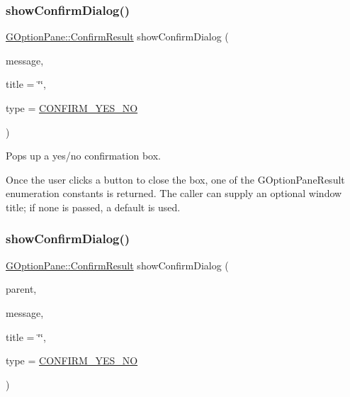 \subsubsection{\texorpdfstring{show\+Confirm\+Dialog()}{showConfirmDialog()}\hspace{0.1cm}{\footnotesize\ttfamily [1/3]}}
{\footnotesize\ttfamily \mbox{\hyperlink{classsgl_1_1GOptionPane_a1cc9e8685029e39646671ed71f32d47d}{G\+Option\+Pane\+::\+Confirm\+Result}} show\+Confirm\+Dialog (\begin{DoxyParamCaption}\item[{const std\+::string \&}]{message,  }\item[{const std\+::string \&}]{title = {\ttfamily \char`\"{}\char`\"{}},  }\item[{\mbox{\hyperlink{classsgl_1_1GOptionPane_a6a1aaf19c06f5a6bef89ea6415547049}{Confirm\+Type}}}]{type = {\ttfamily \mbox{\hyperlink{classsgl_1_1GOptionPane_a6a1aaf19c06f5a6bef89ea6415547049a964914d27eb73a202938a53f43adc4b1}{C\+O\+N\+F\+I\+R\+M\+\_\+\+Y\+E\+S\+\_\+\+NO}}} }\end{DoxyParamCaption})\hspace{0.3cm}{\ttfamily [static]}}



Pops up a yes/no confirmation box. 

Once the user clicks a button to close the box, one of the G\+Option\+Pane\+Result enumeration constants is returned. The caller can supply an optional window title; if none is passed, a default is used. \mbox{\label{classsgl_1_1GOptionPane_a9afd93d6b7b63d77370c87e60285ae71}} 
\subsubsection{\texorpdfstring{show\+Confirm\+Dialog()}{showConfirmDialog()}\hspace{0.1cm}{\footnotesize\ttfamily [2/3]}}
{\footnotesize\ttfamily \mbox{\hyperlink{classsgl_1_1GOptionPane_a1cc9e8685029e39646671ed71f32d47d}{G\+Option\+Pane\+::\+Confirm\+Result}} show\+Confirm\+Dialog (\begin{DoxyParamCaption}\item[{\mbox{\hyperlink{classsgl_1_1GWindow}{G\+Window}} $\ast$}]{parent,  }\item[{const std\+::string \&}]{message,  }\item[{const std\+::string \&}]{title = {\ttfamily \char`\"{}\char`\"{}},  }\item[{\mbox{\hyperlink{classsgl_1_1GOptionPane_a6a1aaf19c06f5a6bef89ea6415547049}{Confirm\+Type}}}]{type = {\ttfamily \mbox{\hyperlink{classsgl_1_1GOptionPane_a6a1aaf19c06f5a6bef89ea6415547049a964914d27eb73a202938a53f43adc4b1}{C\+O\+N\+F\+I\+R\+M\+\_\+\+Y\+E\+S\+\_\+\+NO}}} }\end{DoxyParamCaption})\hspace{0.3cm}{\ttfamily [static]}}



